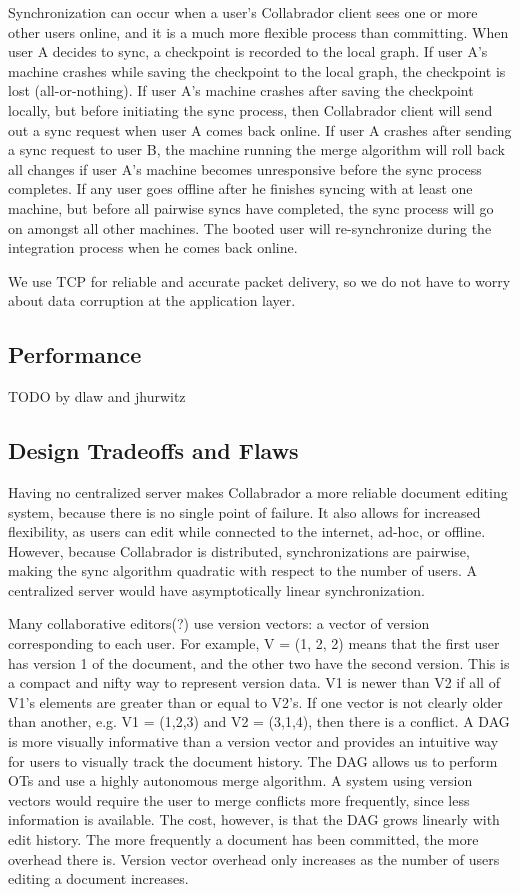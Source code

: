 \documentclass[11pt,titlepage]{article}
\begin{document}
Synchronization can occur when a user's Collabrador client sees one or
more other users online, and it is a much more flexible process than
committing.  When user A decides to sync, a checkpoint is recorded to
the local graph.  If user A's machine crashes while saving the
checkpoint to the local graph, the checkpoint is lost
(all-or-nothing). If user A's machine crashes after saving the
checkpoint locally, but before initiating the sync process, then
Collabrador client will send out a sync request when user A comes back
online.  If user A crashes after sending a sync request to user B, the
machine running the merge algorithm will roll back all changes if user
A's machine becomes unresponsive before the sync process completes. If
any user goes offline after he finishes syncing with at least one
machine, but before all pairwise syncs have completed, the sync
process will go on amongst all other machines. The booted user will
re-synchronize during the integration process when he comes back
online.

We use TCP for reliable and accurate packet delivery, so we do not
have to worry about data corruption at the application layer.

\subsection{Performance}

TODO by dlaw and jhurwitz

\subsection{Design Tradeoffs and Flaws}

Having no centralized server makes Collabrador a more reliable
document editing system, because there is no single point of
failure. It also allows for increased flexibility, as users can edit
while connected to the internet, ad-hoc, or offline. However, because
Collabrador is distributed, synchronizations are pairwise, making the
sync algorithm quadratic with respect to the number of users. A
centralized server would have asymptotically linear synchronization.

Many collaborative editors(?) use version vectors: a vector of version 
corresponding to each user. For example, V = (1, 2, 2) means that the first
user has version 1 of the document, and the other two have the second version.
This is a compact and nifty way to represent version data. V1 is newer than V2
if all of V1's elements are greater than or equal to V2's. If one vector is not
clearly older than another, e.g. V1 = (1,2,3) and V2 = (3,1,4), then there is 
a conflict. A DAG is more visually informative than a version vector and
provides an intuitive way for users to visually track the document
history. The DAG allows us to perform OTs and use a highly autonomous
merge algorithm.  A system using version vectors would require the
user to merge conflicts more frequently, since less information is
available. The cost, however, is that the DAG grows linearly with edit
history. The more frequently a document has been committed, the more
overhead there is. Version vector overhead only increases as the
number of users editing a document increases.
\end{document}
